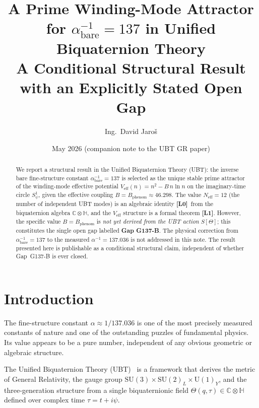 \documentclass[12pt,a4paper]{article}
\title{\textbf{A Prime Winding-Mode Attractor for $\alpha^{-1}_{\mathrm{bare}} = 137$
       in Unified Biquaternion Theory}\\[8pt]
       \large A Conditional Structural Result with an Explicitly Stated Open Gap}
\author{Ing.\ David Jaroš}
\date{May 2026 (companion note to the UBT GR paper)}
\theoremstyle{definition}
\theoremstyle{remark}
\newcommand{\Lzero}{\textbf{[L0]}}
\newcommand{\Lone}{\textbf{[L1]}}
\newcommand{\CC}{\mathbb{C}}
\newcommand{\HH}{\mathbb{H}}
\begin{document}
\maketitle

\begin{abstract}
We report a structural result in the Unified Biquaternion Theory (UBT): the
inverse bare fine-structure constant $\alpha^{-1}_{\mathrm{bare}} = 137$ is
selected as the unique stable prime attractor of the winding-mode effective
potential
$V_{\mathrm{eff}}(n) = n^2 - B\,n\ln n$
on the imaginary-time circle $S^1_\psi$, given the effective coupling
$B = B_{\mathrm{phenom}} \approx 46.298$.
The value $N_{\mathrm{eff}} = 12$ (the number of independent UBT modes) is
an algebraic identity \Lzero\ from the biquaternion algebra $\CC\otimes\HH$,
and the $V_{\mathrm{eff}}$ structure is a formal theorem \Lone.
However, the specific value $B = B_{\mathrm{phenom}}$ is \emph{not yet
derived from the UBT action} $S[\Theta]$; this constitutes the single open
gap labelled \textbf{Gap G137-B}.
The physical correction from $\alpha^{-1}_{\mathrm{bare}} = 137$ to the
measured $\alpha^{-1} = 137.036$ is not addressed in this note.
The result presented here is publishable as a conditional structural claim,
independent of whether Gap~G137-B is ever closed.
\end{abstract}

\tableofcontents
\bigskip

\section{Introduction}
\label{sec:intro}

The fine-structure constant $\alpha \approx 1/137.036$ is one of the most
precisely measured constants of nature and one of the outstanding puzzles of
fundamental physics.  Its value appears to be a pure number, independent of
any obvious geometric or algebraic structure.

The Unified Biquaternion Theory (UBT)~\cite{jaros2026_gr} is a framework
that derives the metric of General Relativity, the gauge group
$\mathrm{SU}(3)\times\mathrm{SU}(2)_L\times\mathrm{U}(1)_Y$, and the
three-generation structure from a single biquaternionic field
$\Theta(q,\tau) \in \CC\otimes\HH$
defined over complex time $\tau = t + i\psi$.
\end{document}
